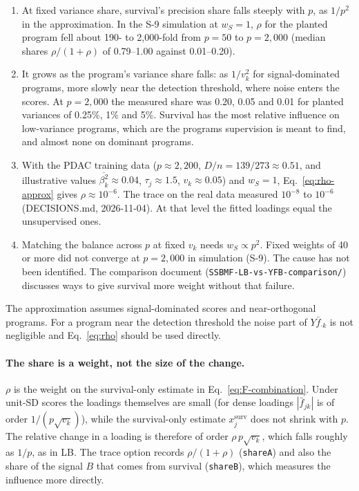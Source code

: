 \documentclass[11pt]{article}
\newcommand{\betasec}[1]{\overline{\beta^2_{#1}}}
\newcommand{\ws}{w_S}
\begin{document}
\begin{keybox}
\begin{enumerate}
  \item At fixed variance share, survival's precision share falls steeply with
        $p$, as $1/p^2$ in the approximation. In the S-9 simulation at $\ws = 1$,
        $\rho$ for the planted program fell about 190- to 2{,}000-fold from $p = 50$ to
        $p = 2{,}000$ (median shares $\rho/(1+\rho)$ of 0.79--1.00 against
        0.01--0.20).
  \item It grows as the program's variance share falls: as $1/v_k^2$ for
        signal-dominated programs, more slowly near the detection threshold,
        where noise enters the scores. At $p = 2{,}000$ the measured share was
        0.20, 0.05 and 0.01 for planted variances of 0.25\%, 1\% and 5\%.
        Survival has the most relative influence on low-variance programs, which
        are the programs supervision is meant to find, and almost none on
        dominant programs.
  \item With the PDAC training data ($p\approx 2{,}200$, $D/n = 139/273\approx 0.51$,
        and illustrative values $\betasec{k}\approx 0.04$, $\tau_j\approx 1.5$, $v_k\approx 0.05$) and
        $\ws = 1$, Eq.~\eqref{eq:rho-approx} gives $\rho\approx 10^{-6}$. The
        trace on the real data measured $10^{-8}$ to $10^{-6}$
        (DECISIONS.md, 2026-11-04). At that level the fitted loadings equal the
        unsupervised ones.
  \item Matching the balance across $p$ at fixed $v_k$ needs $\ws\propto p^2$.
        Fixed weights of 40 or more did not converge at $p = 2{,}000$ in
        simulation (S-9). The cause has not been identified. The comparison document
        (\texttt{SSBMF-LB-vs-YFB-comparison/}) discusses ways to give survival
        more weight without that failure.
\end{enumerate}
The approximation assumes signal-dominated scores and near-orthogonal programs.
For a program near the detection threshold the noise part of $Y\bar f_{\cdot k}$
is not negligible and Eq.~\eqref{eq:rho} should be used directly.
\end{keybox}

\paragraph{The share is a weight, not the size of the change.} $\rho$ is the weight
on the survival-only estimate in Eq.~\eqref{eq:F-combination}. Under unit-SD scores
the loadings themselves are small (for dense loadings $|\bar f_{jk}|$ is of order
$1/(p\sqrt{v_k})$), while the survival-only estimate $x^{\text{surv}}_j$ does not
shrink with $p$. The relative change in a loading is therefore of order
$\rho\,p\sqrt{v_k}$, which falls roughly as $1/p$, as in LB. The trace option
records $\rho/(1+\rho)$ (\texttt{shareA}) and also the share of the signal $B$ that
comes from survival (\texttt{shareB}), which measures the influence more directly.
\end{document}
